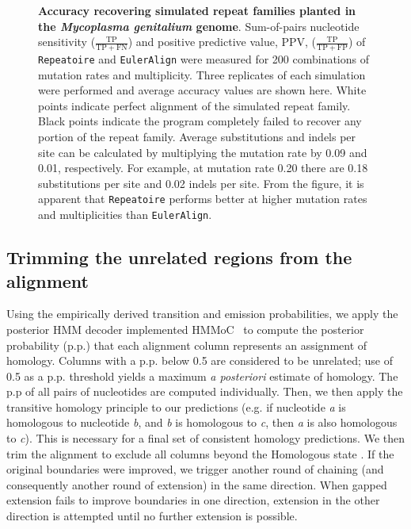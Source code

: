 \documentclass[12pt,journal,letterpaper,onecolumn, draftcls]{IEEEtran}
\begin{document}
\begin{figure*}[th!]
\centering {}
\caption[Accuracy recovering simulated repeat families planted in the
\textit{Mycoplasma genitalium} genome]%
{\textbf{Accuracy recovering simulated repeat families planted in the
\textit{Mycoplasma genitalium} genome}.  Sum-of-pairs nucleotide
sensitivity ($\frac{\mathrm{TP}}{\mathrm{TP} + \mathrm{FN}}$) and positive predictive value, PPV, ($\frac{\mathrm{TP}}{\mathrm{TP} +
\mathrm{FP}}$) of \texttt{Repeatoire}
and \texttt{EulerAlign} were measured for 200
combinations of mutation rates and multiplicity.  Three replicates of
each simulation were performed and average accuracy values are shown
here.  White points indicate perfect alignment of the simulated repeat
family.  Black points indicate the program completely failed to
recover any portion of the repeat family.  Average substitutions and indels per site can be
calculated by multiplying the mutation rate by 0.09 and 0.01, respectively.  For example, at mutation rate 0.20
there are 0.18 substitutions per site and 0.02 indels per site.  From
the figure, it is apparent that \texttt{Repeatoire} performs better
at higher mutation rates and multiplicities than \texttt{EulerAlign}.}
\label{fig-results}
\end{figure*}


\subsection{Trimming the unrelated regions from the alignment}
Using the empirically derived transition and emission probabilities,
we apply the posterior HMM decoder implemented HMMoC~\cite{Lunter2007} to compute the posterior probability (p.p.) that
each alignment column represents an assignment of homology.  Columns with a
p.p. below 0.5 are considered to be unrelated; use of 0.5 as a p.p. threshold
yields a maximum \textit{a posteriori} estimate of homology.  The p.p of all pairs of nucleotides are
computed individually. Then, we then apply the
transitive homology principle to our predictions (e.g. if nucleotide \emph{a} is homologous
to nucleotide \emph{b}, and \emph{b} is homologous to \emph{c}, then \emph{a} is also homologous to \emph{c}). This
is necessary for a final
set of consistent homology predictions.  We then trim the alignment to exclude all
columns beyond the Homologous state . If the original boundaries were
improved, we trigger another round of chaining (and consequently
another round of extension) in the same direction.
When gapped extension fails to improve boundaries
in one direction, extension in the other direction is attempted until
no further extension is possible.
\end{document}
